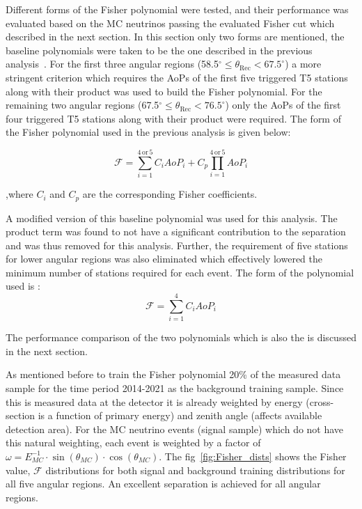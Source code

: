 Different forms of the Fisher polynomial were tested, and their performance was evaluated based on the MC neutrinos passing the evaluated Fisher cut which described in the next section. In this section only two forms are mentioned, the baseline polynomials were taken to be the one described in the previous analysis~\cite{gap_note_2013}. For the first three angular regions (58.5$^\circ \leq \theta_{\text{Rec}} < 67.5^\circ$) a more stringent criterion which requires the AoPs of the first five triggered T5 stations along with their product was used to build the Fisher polynomial. For the remaining two angular regions (67.5$^\circ \leq \theta_{\text{Rec}} < 76.5^\circ$) only the AoPs of the first four triggered T5 stations along with their product were required. The form of the Fisher polynomial used in the previous analysis is given below:

\begin{equation}
  \mathcal{F} = \sum_{i=1}^{4\,\text{or}\,5} C_i AoP_i + C_p \prod_{i=1}^{4\,\text{or}\,5} AoP_i
\end{equation}

,where $C_i$ and $C_p$ are the corresponding Fisher coefficients. 

A modified version of this baseline polynomial was used for this analysis. The product term was found to not have a significant contribution to the separation and was thus removed for this analysis. Further, the requirement of five stations for lower angular regions was also eliminated which effectively lowered the minimum number of stations required for each event. The form of the polynomial used is : 
\begin{equation}
  \label{eq:fisher_poly_new}
  \mathcal{F} = \sum_{i=1}^{4} C_i AoP_i
\end{equation}

The performance comparison of the two polynomials which is also the is discussed in the next section.

As mentioned before to train the Fisher polynomial 20\% of the measured data sample for the time period 2014-2021 as the background training sample. Since this is measured data at the detector it is already weighted by energy (cross-section is a function of primary energy) and zenith angle (affects available detection area). For the MC neutrino events (signal sample) which do not have this natural weighting, each event is weighted by a factor of $\omega = E_{MC}^{-1} \cdot \sin(\theta_{MC}) \cdot \cos(\theta_{MC})$. The fig~\ref{fig:Fisher_dists} shows the Fisher value, $\mathcal{F}$ distributions for both signal and background training distributions for all five angular regions. An excellent separation is achieved for all angular regions. 


